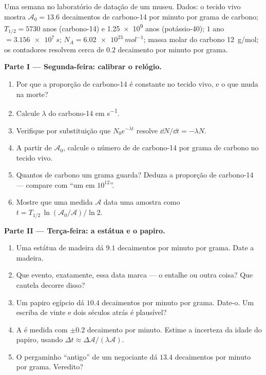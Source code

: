 \begin{problem}
\label{pb:g12:radioactive-decay:1}
Uma semana no laboratório de datação de um museu. Dados: o tecido vivo mostra
$\mathcal A_0 = 13.6$ decaimentos de carbono-14 por minuto por grama de carbono;
$T_{1/2} = \num{5730}$ anos (carbono-14) e \num{1.25e9} anos (potássio-40); $1$ ano
$= \qty{3.156e7}{s}$; $N_A = \qty{6.02e23}{mol^{-1}}$; massa molar do carbono
\qty{12}{g/mol}; os contadores resolvem cerca de $0.2$ decaimento por minuto por grama.

\medskip
\noindent\textbf{Parte I --- Segunda-feira: calibrar o relógio.}
\begin{enumerate}
  \item Por que a proporção de carbono-14 é constante no tecido vivo, e o que muda na
        morte?
  \item Calcule $\lambda$ do carbono-14 em \unit{s^{-1}}.
  \item Verifique por substituição que $N_0 e^{-\lambda t}$ resolve
        $\dd N/\dd t = -\lambda N$.
  \item A partir de $\mathcal A_0$, calcule o número de  de carbono-14 por grama
        de carbono no tecido vivo.
  \item Quantos  de carbono um grama guarda? Deduza a proporção de carbono-14 ---
        compare com ``um em $10^{12}$''.
  \item Mostre que uma  medida $\mathcal A$ data uma amostra como
        $t = T_{1/2}\,\ln(\mathcal A_0/\mathcal A)/\ln 2$.
\end{enumerate}

\medskip
\noindent\textbf{Parte II --- Terça-feira: a estátua e o papiro.}
\begin{enumerate}[resume]
  \item Uma estátua de madeira dá $9.1$ decaimentos por minuto por grama. Date a
        madeira.
  \item Que evento, exatamente, essa data marca --- o entalhe ou outra coisa? Que
        cautela decorre disso?
  \item Um papiro egípcio dá $10.4$ decaimentos por minuto por grama. Date-o. Um escriba
        de vinte e dois séculos atrás é plausível?
  \item A  é medida com $\pm 0.2$ decaimento por minuto. Estime a incerteza da
        idade do papiro, usando $\Delta t \approx \Delta\mathcal A/(\lambda \mathcal A)$.
  \item O pergaminho ``antigo'' de um negociante dá $13.4$ decaimentos por minuto por
        grama. Veredito?
\end{enumerate}


\end{problem}

